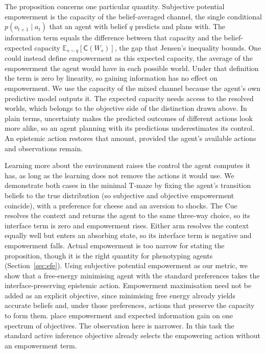 \documentclass[pdflatex,sn-apa]{sn-jnl}%
\theoremstyle{definition}
\providecommand{\E}{\mathbb{E}}
\providecommand{\Capa}{\mathsf{C}}
\begin{document}
The proposition concerns one particular quantity. Subjective potential empowerment is the capacity of the belief-averaged channel, the single conditional $p(o_{t+1} \mid a_t)$ that an agent with belief $q$ predicts and plans with. The information term equals the difference between that capacity and the belief-expected capacity $\E_{s \sim q}[\Capa(W_s)]$, the gap that Jensen's inequality bounds. One could instead define empowerment as this expected capacity, the average of the empowerment the agent would have in each possible world. Under that definition the term is zero by linearity, so gaining information has no effect on empowerment. We use the capacity of the mixed channel because the agent's own predictive model outputs it. The expected capacity needs access to the resolved worlds, which belongs to the objective side of the distinction drawn above. In plain terms, uncertainty makes the predicted outcomes of different actions look more alike, so an agent planning with its predictions underestimates its control. An epistemic action restores that amount, provided the agent's available actions and observations remain.

Learning more about the environment raises the control the agent computes it has, as long as the learning does not remove the actions it would use. We demonstrate both cases in the minimal T-maze by fixing the agent's transition beliefs to the true distribution (so subjective and objective empowerment coincide), with a preference for cheese and an aversion to shocks. The Cue resolves the context and returns the agent to the same three-way choice, so its interface term is zero and empowerment rises. Either arm resolves the context equally well but enters an absorbing state, so its interface term is negative and empowerment falls. Actual empowerment is too narrow for stating the proposition, though it is the right quantity for phenotyping agents (Section~\ref{sec:efe}). Using subjective potential empowerment as our metric, we show that a free-energy minimising agent with the standard preferences takes the interface-preserving epistemic action. Empowerment maximisation need not be added as an explicit objective, since minimising free energy already yields accurate beliefs and, under those preferences, actions that preserve the capacity to form them. \citet{hafnerActionPerceptionDivergence2020} place empowerment and expected information gain on one spectrum of objectives. The observation here is narrower. In this task the standard active inference objective already selects the empowering action without an empowerment term.
\end{document}
